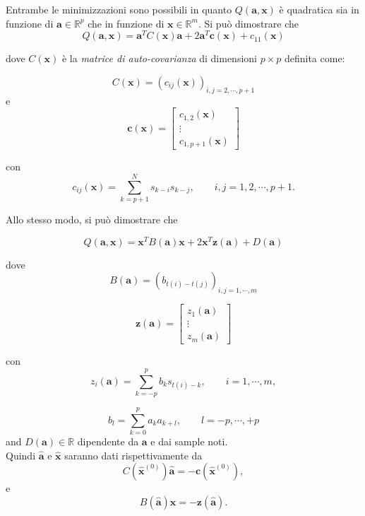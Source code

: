 \documentclass{article}
\begin{document}
Entrambe le minimizzazioni sono possibili in quanto $Q(\mathbf{a},\mathbf{x})$ è quadratica sia in funzione di $\mathbf{a} \in \mathbb{R}^{p} $ che in funzione di $\mathbf{x} \in \mathbb{R}^{m}$. Si può dimostrare che
\begin{equation}
Q(\mathbf{a},\mathbf{x}) = \mathbf{a}^{T}C(\mathbf{x})\mathbf{a} +
2\mathbf{a}^{T}\mathbf{c}(\mathbf{x}) + c_{11}(\mathbf{x})
\end{equation}

dove $C(\mathbf{x})$ è la \emph{matrice di auto-covarianza} di dimensioni $p \times p$
definita come:%

\[
C(\mathbf{x}) = (c_{ij}(\mathbf{x}))_{i,j = 2, \cdots, p+1}
\] e 
\[
\mathbf{c}(\mathbf{x}) = 
\left[
\begin{array}{c}
c_{1,2}(\mathbf{x}) \\ \vdots \\ c_{1,p+1}(\mathbf{x})
\end{array}
\right]
\]

con %
\[
c_{ij}(\mathbf{x}) = \sum_{k=p+1}^{N} s_{k-i}s_{k-j},
\qquad
i,j = 1,2, \cdots , p+1.
\]


Allo stesso modo, si può dimostrare che 
	
\begin{equation}
Q(\mathbf{a},\mathbf{x}) = \mathbf{x}^{T}B(\mathbf{a})\mathbf{x} +
2\mathbf{x}^{T}\mathbf{z}(\mathbf{a}) + D(\mathbf{a})
\end{equation}

dove
\begin{equation} \label{ii11}
B(\mathbf{a}) = (b_{t(i)-t(j)})_{i,j = 1, \cdots, m}
\end{equation}

\[
\mathbf{z}(\mathbf{a}) = 
\left[
\begin{array}{c}
z_{1}(\mathbf{a}) \\ \vdots \\ z_{m}(\mathbf{a})
\end{array}
\right]
\]

con %
\[
z_{i}(\mathbf{a}) = \sum_{k=-p}^{p} b_{k}s_{t(i)-k},
\qquad
i = 1, \cdots, m,
\]

\begin{equation} \label{ii3}
b_{l} = \sum_{k=0}^{p} a_{k}a_{k+l},
\qquad
l = -p, \cdots , +p
\end{equation}
and $D(\mathbf{a}) \in \mathbb{R}$ dipendente da $\mathbf{a}$ e dai sample noti.
\\Quindi $\mathbf{\hat{a}}$ e $\mathbf{\hat{x}}$ saranno dati rispettivamente da
\begin{equation} \label{ii13}
C(\mathbf{\hat{x}}^{(0)})\mathbf{\hat{a}} = - \mathbf{c}(\mathbf{\hat{x}}^{(0)}),
\end{equation}
e
\begin{equation} \label{ii14}
B(\mathbf{\hat{a}})\mathbf{\hat{x}} = - \mathbf{z}(\mathbf{\hat{a}}).
\end{equation}
\end{document}

